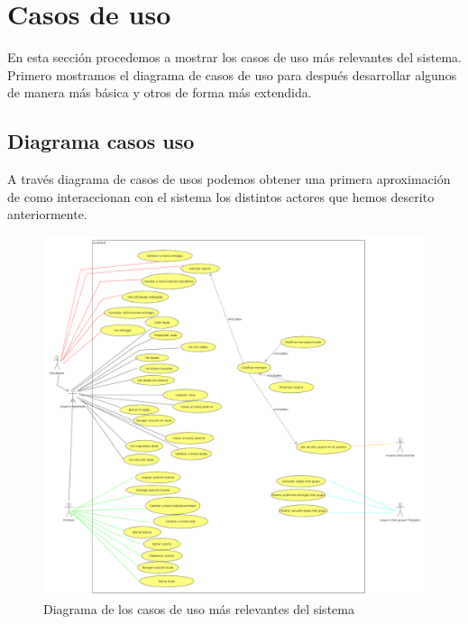 \newpage

\section{Casos de uso}

En esta sección procedemos a mostrar los casos de uso más relevantes del sistema. Primero mostramos el diagrama de casos de uso para después desarrollar algunos de manera más básica y otros de forma  más extendida.

\subsection{Diagrama casos uso}

A través diagrama de casos de usos podemos obtener una primera aproximación de como interaccionan con el sistema los distintos actores  que hemos descrito anteriormente. 
\begin{figure}[H] %
\centering
\includegraphics[scale=0.2]{imagenes/diagramas/diagrama_caso_uso.png}  %

\caption{Diagrama de los casos de uso más relevantes del sistema}\label{figura10}
\end{figure}


